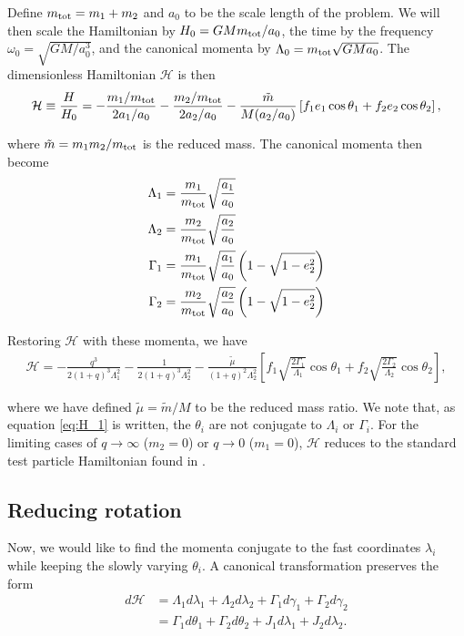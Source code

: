 \documentclass[usenatbib]{mnras}
\begin{document}
\noindent Define \(m_{\rm tot} = m_1+m_2\) and \(a_0\) to be the
scale length of the problem.  We will then scale the Hamiltonian by
\(H_0 = GMm_{\rm tot}/a_0\), the time by the frequency \(\omega_0 =
\sqrt{GM/a_0^3}\), and the canonical momenta by \(\Lambda_0 = m_{\rm
tot} \sqrt{GMa_0}\).  The dimensionless Hamiltonian \(\mathcal{H}\) is
then
\begin{align}
  \mathcal{H} \equiv \frac{H}{H_0}
  = -\frac{m_1/m_{\rm tot}}{2a_1/a_0}
    -\frac{m_2/m_{\rm tot}}{2a_2/a_0}
  -\frac{\tilde m}{M (a_2/a_0)}\left[
    f_1e_1\cos\theta_1+f_2e_2\cos\theta_2
    \right],
\end{align}

\noindent
where \(\tilde m = m_1m_2/m_{\rm tot}\) is the reduced mass.
The canonical momenta then become
\begin{align}
  \Lambda_1 &= \frac{m_1}{m_{\rm tot}}\sqrt{\frac{a_1}{a_0}} \\
  \Lambda_2 &= \frac{m_2}{m_{\rm tot}}\sqrt{\frac{a_2}{a_0}} \\
  \Gamma_1 &= \frac{m_1}{m_{\rm tot}}\sqrt{\frac{a_1}{a_0}}
             \left(1-\sqrt{1-e_2^2}\right) \\
  \Gamma_2 &= \frac{m_2}{m_{\rm tot}}\sqrt{\frac{a_2}{a_0}}
             \left(1-\sqrt{1-e_2^2}\right)
\end{align}

\noindent
Restoring \(\mathcal{H}\) with these momenta, we have
\begin{align}
\label{eq:H_1}
  \mathcal{H}
  = -\frac{q^3}{2(1+q)^3 \Lambda_1^2}
    - \frac{1}{2(1+q)^3\Lambda_2^2}
   - \frac{\tilde\mu}{(1+q)^2 \Lambda_2^2}\left[
    f_1\sqrt{\frac{2\Gamma_1}{\Lambda_1}}\cos\theta_1
    +f_2\sqrt{\frac{2\Gamma_2}{\Lambda_2}}\cos\theta_2
    \right],
\end{align}

\noindent where we have defined \(\tilde\mu=\tilde m/M\) to be
the reduced mass ratio.  We note that, as equation \eqref{eq:H_1} is
written, the \(\theta_i\) are not conjugate to \(\Lambda_i\) or
\(\Gamma_i\).  For the limiting cases of \(q\to \infty\) (\(m_2=0\)) or
\(q\to 0\) (\(m_1=0\)), \(\mathcal{H}\) reduces to the standard test
particle Hamiltonian found in \citet{murray_solar_2000}.
\subsection{Reducing rotation}
\label{sec:org6882673}
Now, we would like to find the momenta conjugate to the fast
coordinates \(\lambda_i\) while keeping the slowly varying \(\theta_i\).
A canonical transformation preserves the form
\begin{align}
  \label{eq:dH} 
  d\mathcal{H}
  &= \Lambda_1 d\lambda_1+\Lambda_2d\lambda_2
    + \Gamma_1d\gamma_1+\Gamma_2d\gamma_2\nonumber\\
  &= \Gamma_1 d\theta_1 + \Gamma_2 d\theta_2
    +J_1 d\lambda_1+J_2d\lambda_2 .
\end{align}
\end{document}
